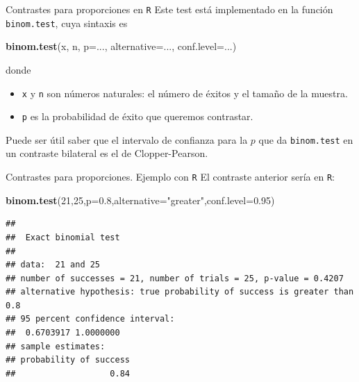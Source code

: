 \documentclass[
  ignorenonframetext,
]{beamer}
\newenvironment{Shaded}{\begin{snugshade}}{\end{snugshade}}
\newcommand{\DataTypeTok}[1]{\textcolor[rgb]{0.13,0.29,0.53}{#1}}
\newcommand{\DecValTok}[1]{\textcolor[rgb]{0.00,0.00,0.81}{#1}}
\newcommand{\FloatTok}[1]{\textcolor[rgb]{0.00,0.00,0.81}{#1}}
\newcommand{\KeywordTok}[1]{\textcolor[rgb]{0.13,0.29,0.53}{\textbf{#1}}}
\newcommand{\NormalTok}[1]{#1}
\newcommand{\StringTok}[1]{\textcolor[rgb]{0.31,0.60,0.02}{#1}}
\begin{document}
\begin{frame}[fragile]{Contrastes para proporciones en \texttt{R}}
\protect\hypertarget{contrastes-para-proporciones-en-r}{}
Este test está implementado en la función \texttt{binom.test}, cuya
sintaxis es

\begin{Shaded}
\begin{Highlighting}[]
\KeywordTok{binom.test}\NormalTok{(x, n, }\DataTypeTok{p=}\NormalTok{..., }\DataTypeTok{alternative=}\NormalTok{..., }\DataTypeTok{conf.level=}\NormalTok{...)}
\end{Highlighting}
\end{Shaded}

donde

\begin{itemize}[<+->]
\item
  \texttt{x} y \texttt{n} son números naturales: el número de éxitos y
  el tamaño de la muestra.
\item
  \texttt{p} es la probabilidad de éxito que queremos contrastar.
\end{itemize}

Puede ser útil saber que el intervalo de confianza para la \(p\) que da
\texttt{binom.test} en un contraste bilateral es el de Clopper-Pearson.
\end{frame}

\begin{frame}[fragile]{Contrastes para proporciones. Ejemplo con
\texttt{R}}
\protect\hypertarget{contrastes-para-proporciones.-ejemplo-con-r}{}
El contraste anterior sería en \texttt{R}:

\begin{Shaded}
\begin{Highlighting}[]
\KeywordTok{binom.test}\NormalTok{(}\DecValTok{21}\NormalTok{,}\DecValTok{25}\NormalTok{,}\DataTypeTok{p=}\FloatTok{0.8}\NormalTok{,}\DataTypeTok{alternative=}\StringTok{"greater"}\NormalTok{,}\DataTypeTok{conf.level=}\FloatTok{0.95}\NormalTok{)}
\end{Highlighting}
\end{Shaded}

\begin{verbatim}
## 
##  Exact binomial test
## 
## data:  21 and 25
## number of successes = 21, number of trials = 25, p-value = 0.4207
## alternative hypothesis: true probability of success is greater than 0.8
## 95 percent confidence interval:
##  0.6703917 1.0000000
## sample estimates:
## probability of success 
##                   0.84
\end{verbatim}
\end{frame}
\end{document}
